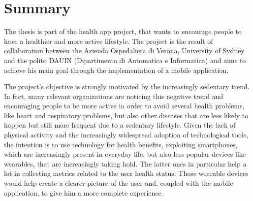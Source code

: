 \section{Summary}

The thesis is part of the health app project, that wants to encourage people to have a healthier and more active lifestyle. The project is the result of collaboration between the Azienda Ospedaliera di Verona, University of Sydney and the polito DAUIN (Dipartimento di Automatica e Informatica) and aims to achieve his main goal through the implementation of a mobile application.

\noindent The project's objective is strongly motivated by the increasingly sedentary trend. In fact, many relevant organizations are noticing this negative trend and encouraging people to be more active in order to avoid several health problems, like heart and respiratory problems, but also other diseases that are less likely to happen but still more frequent due to a sedentary lifestyle. Given the lack of physical activity and the increasingly widespread adoption of technological tools, the intention is to use technology for health benefits, exploiting smartphones, which are increasingly present in everyday life, but also less popular devices like wearables, that are increasingly taking hold. The latter ones in particular help a lot in collecting metrics related to the user health status. Those wearable devices would help create a clearer picture of the user and, coupled with the mobile application, to give him a more complete experience. 

